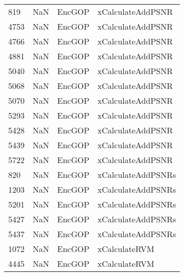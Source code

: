 \begin{tabular}{llll}
819  &                   NaN &                     EncGOP &                         xCalculateAddPSNR \\
4753 &                   NaN &                     EncGOP &                         xCalculateAddPSNR \\
4766 &                   NaN &                     EncGOP &                         xCalculateAddPSNR \\
4881 &                   NaN &                     EncGOP &                         xCalculateAddPSNR \\
5040 &                   NaN &                     EncGOP &                         xCalculateAddPSNR \\
5068 &                   NaN &                     EncGOP &                         xCalculateAddPSNR \\
5070 &                   NaN &                     EncGOP &                         xCalculateAddPSNR \\
5293 &                   NaN &                     EncGOP &                         xCalculateAddPSNR \\
5428 &                   NaN &                     EncGOP &                         xCalculateAddPSNR \\
5439 &                   NaN &                     EncGOP &                         xCalculateAddPSNR \\
5722 &                   NaN &                     EncGOP &                         xCalculateAddPSNR \\
820  &                   NaN &                     EncGOP &                        xCalculateAddPSNRs \\
1203 &                   NaN &                     EncGOP &                        xCalculateAddPSNRs \\
5201 &                   NaN &                     EncGOP &                        xCalculateAddPSNRs \\
5427 &                   NaN &                     EncGOP &                        xCalculateAddPSNRs \\
5437 &                   NaN &                     EncGOP &                        xCalculateAddPSNRs \\
1072 &                   NaN &                     EncGOP &                             xCalculateRVM \\
4445 &                   NaN &                     EncGOP &                             xCalculateRVM \\

\end{tabular}
